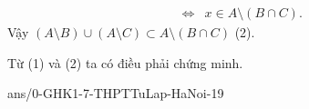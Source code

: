 \begin{bt}
{\begin{itemize}
\begin{eqnarray*}
&\Leftrightarrow & x\in A\setminus	\left(B\cap C\right).
\end{eqnarray*}
Vậy $\left(A \setminus B\right) \cup \left(A\setminus C\right) \subset A\setminus	\left(B\cap C\right)$ \quad (2).
\end{itemize}
Từ (1) và (2) ta có điều phải chứng minh.
}
\end{bt}



\newpage
\begin{indapan}{10}
	{ans/0-GHK1-7-THPTTuLap-HaNoi-19}
\end{indapan}

